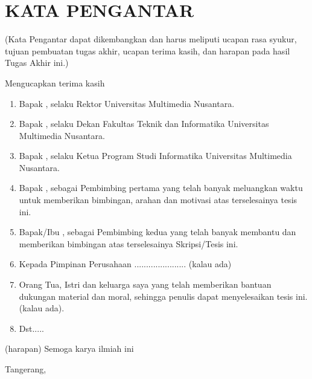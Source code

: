 \chapter*{KATA PENGANTAR}

(Kata Pengantar dapat dikembangkan dan harus meliputi ucapan rasa syukur, tujuan pembuatan tugas akhir, ucapan terima kasih, dan harapan pada hasil Tugas Akhir ini.)

\noindent Mengucapkan terima kasih
\begin{enumerate}
	\item Bapak \rektorUMN, selaku Rektor Universitas Multimedia
Nusantara. 
	\item Bapak \dekanFTI, selaku Dekan Fakultas Teknik dan Informatika Universitas Multimedia Nusantara.
	\item Bapak \kaprodi, selaku Ketua Program Studi Informatika Universitas Multimedia Nusantara. 
	\item Bapak \pembimbing,  sebagai Pembimbing pertama yang telah banyak meluangkan
waktu untuk memberikan bimbingan, arahan dan motivasi atas
terselesainya tesis ini.
\item Bapak/Ibu \pembimbingb, sebagai Pembimbing kedua yang telah banyak membantu dan
memberikan bimbingan atas terselesainya Skripsi/Tesis ini.
\item Kepada Pimpinan Perusahaan ...................... (kalau ada)
\item Orang Tua, Istri dan keluarga saya yang telah memberikan bantuan
dukungan material dan moral, sehingga penulis dapat menyelesaikan tesis
ini. (kalau ada).
\item Dst.....
\end{enumerate}
(harapan) Semoga karya ilmiah ini

\vspace*{0.1cm}

\begin{flushright}
Tangerang, \tanggalPengumpulan \\[0.1cm]
\vspace*{2cm}
\penulis
\end{flushright}